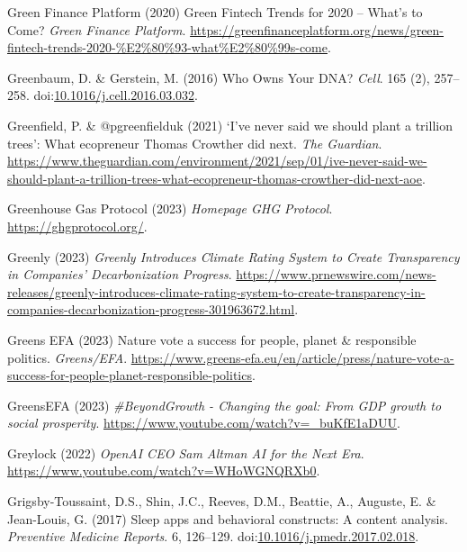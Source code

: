 \documentclass[
  letterpaper,
  DIV=11,
  numbers=noendperiod]{scrartcl}
\newlength{\cslhangindent}
\newenvironment{CSLReferences}[2] %
 {\begin{list}{}{%
  \setlength{\itemindent}{0pt}
  \setlength{\leftmargin}{0pt}
  \setlength{\parsep}{0pt}
  \ifodd #1
   \setlength{\leftmargin}{\cslhangindent}
   \setlength{\itemindent}{-1\cslhangindent}
  \fi
  \setlength{\itemsep}{#2\baselineskip}}}
 {\end{list}}
\begin{document}
\begin{CSLReferences}{0}{1}
Green Finance Platform (2020) Green {Fintech Trends} for 2020 --
{What}'s to {Come}? \emph{Green Finance Platform}.
\url{https://greenfinanceplatform.org/news/green-fintech-trends-2020-\%E2\%80\%93-what\%E2\%80\%99s-come}.

Greenbaum, D. \& Gerstein, M. (2016) Who {Owns Your DNA}? \emph{Cell}.
165 (2), 257--258.
doi:\href{https://doi.org/10.1016/j.cell.2016.03.032}{10.1016/j.cell.2016.03.032}.

Greenfield, P. \& @pgreenfielduk (2021) {`{I}'ve never said we should
plant a trillion trees'}: What ecopreneur {Thomas Crowther} did next.
\emph{The Guardian}.
\url{https://www.theguardian.com/environment/2021/sep/01/ive-never-said-we-should-plant-a-trillion-trees-what-ecopreneur-thomas-crowther-did-next-aoe}.

Greenhouse Gas Protocol (2023) \emph{Homepage {\textbar} {GHG
Protocol}}. \url{https://ghgprotocol.org/}.

Greenly (2023) \emph{Greenly {Introduces Climate Rating System} to
{Create Transparency} in {Companies}' {Decarbonization Progress}}.
\url{https://www.prnewswire.com/news-releases/greenly-introduces-climate-rating-system-to-create-transparency-in-companies-decarbonization-progress-301963672.html}.

Greens EFA (2023) Nature vote a success for people, planet \&
responsible politics. \emph{Greens/EFA}.
\url{https://www.greens-efa.eu/en/article/press/nature-vote-a-success-for-people-planet-responsible-politics}.

GreensEFA (2023) \emph{\#{BeyondGrowth} - {Changing} the goal: From
{GDP} growth to social prosperity}.
\url{https://www.youtube.com/watch?v=_buKfE1aDUU}.

Greylock (2022) \emph{{OpenAI CEO Sam Altman} {\textbar} {AI} for the
{Next Era}}. \url{https://www.youtube.com/watch?v=WHoWGNQRXb0}.

Grigsby-Toussaint, D.S., Shin, J.C., Reeves, D.M., Beattie, A., Auguste,
E. \& Jean-Louis, G. (2017) Sleep apps and behavioral constructs: {A}
content analysis. \emph{Preventive Medicine Reports}. 6, 126--129.
doi:\href{https://doi.org/10.1016/j.pmedr.2017.02.018}{10.1016/j.pmedr.2017.02.018}.


\end{CSLReferences}
\end{document}
